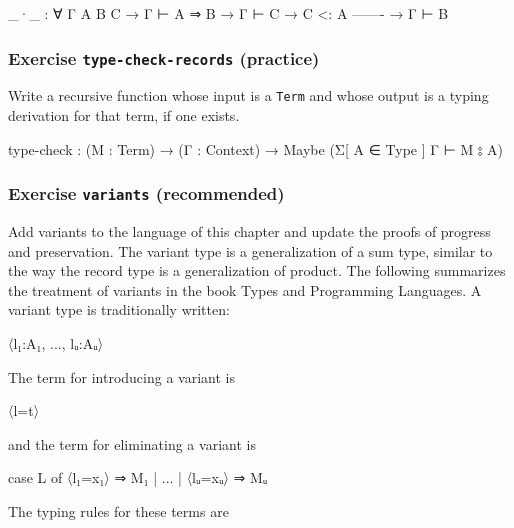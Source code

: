 \begin{myDisplay}
_·_ : ∀ {Γ A B C}
  → Γ ⊢ A ⇒ B
  → Γ ⊢ C
  → C <: A
    -------
  → Γ ⊢ B
\end{myDisplay}

\hypertarget{exercise-type-check-records-practice}{%
\subsubsection{\texorpdfstring{Exercise \texttt{type-check-records}
(practice)}{Exercise type-check-records (practice)}}\label{exercise-type-check-records-practice}}

Write a recursive function whose input is a \texttt{Term} and whose
output is a typing derivation for that term, if one exists.

\begin{myDisplay}
type-check : (M : Term) → (Γ : Context) → Maybe (Σ[ A ∈ Type ] Γ ⊢ M ⦂ A)
\end{myDisplay}

\hypertarget{exercise-variants-recommended}{%
\subsubsection{\texorpdfstring{Exercise \texttt{variants}
(recommended)}{Exercise variants (recommended)}}\label{exercise-variants-recommended}}

Add variants to the language of this chapter and update the proofs of
progress and preservation. The variant type is a generalization of a sum
type, similar to the way the record type is a generalization of product.
The following summarizes the treatment of variants in the book Types and
Programming Languages. A variant type is traditionally written:

\begin{myDisplay}
〈l₁:A₁, ..., lᵤ:Aᵤ〉
\end{myDisplay}

The term for introducing a variant is

\begin{myDisplay}
〈l=t〉
\end{myDisplay}

and the term for eliminating a variant is

\begin{myDisplay}
case L of 〈l₁=x₁〉 ⇒ M₁ | ... | 〈lᵤ=xᵤ〉 ⇒ Mᵤ
\end{myDisplay}

The typing rules for these terms are


